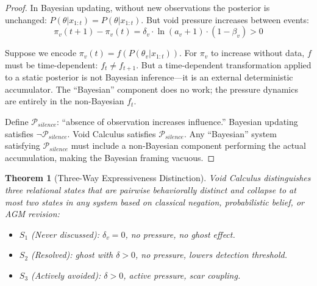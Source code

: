\documentclass[11pt]{article}
\newtheorem{theorem}{Theorem}[section]
\begin{document}
\begin{proof}
In Bayesian updating, without new observations the posterior is unchanged: $P(\theta | x_{1:t}) = P(\theta | x_{1:t})$. But void pressure increases between events:
\begin{equation}
\pi_v(t+1) - \pi_v(t) = \delta_v \cdot \ln(a_v + 1) \cdot (1 - \beta_v) > 0
\end{equation}

Suppose we encode $\pi_v(t) = f(P(\theta_v | x_{1:t}))$. For $\pi_v$ to increase without data, $f$ must be time-dependent: $f_t \neq f_{t+1}$. But a time-dependent transformation applied to a static posterior is not Bayesian inference---it is an external deterministic accumulator. The ``Bayesian'' component does no work; the pressure dynamics are entirely in the non-Bayesian $f_t$.

Define $\mathcal{P}_{silence}$: ``absence of observation increases influence.'' Bayesian updating satisfies $\neg\mathcal{P}_{silence}$. Void Calculus satisfies $\mathcal{P}_{silence}$. Any ``Bayesian'' system satisfying $\mathcal{P}_{silence}$ must include a non-Bayesian component performing the actual accumulation, making the Bayesian framing vacuous.
\end{proof}

\begin{theorem}[Three-Way Expressiveness Distinction]
\label{thm:void-three-way}
Void Calculus distinguishes three relational states that are pairwise behaviorally distinct and collapse to at most two states in any system based on classical negation, probabilistic belief, or AGM revision:
\begin{itemize}
\item $S_1$ (Never discussed): $\delta_v = 0$, no pressure, no ghost effect.
\item $S_2$ (Resolved): ghost with $\delta > 0$, no pressure, lowers detection threshold.
\item $S_3$ (Actively avoided): $\delta > 0$, active pressure, scar coupling.
\end{itemize}
\end{theorem}
\end{document}
